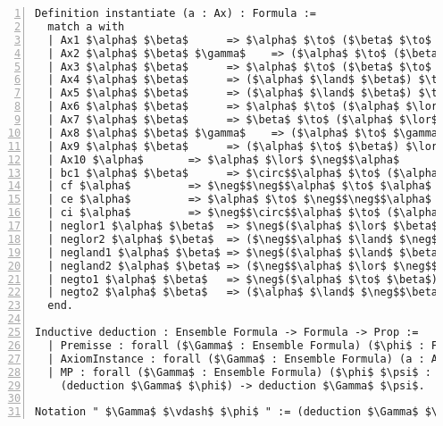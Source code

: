\begin{lstlisting}[name=Syntax, numbers=left, frame=single, language=coq]
Definition instantiate (a : Ax) : Formula :=
  match a with 
  | Ax1 $\alpha$ $\beta$      => $\alpha$ $\to$ ($\beta$ $\to$ $\alpha$)
  | Ax2 $\alpha$ $\beta$ $\gamma$    => ($\alpha$ $\to$ ($\beta$ $\to$ $\gamma$)) $\to$ (($\alpha$ $\to$ $\beta$) $\to$ ($\alpha$ $\to$ $\gamma$))
  | Ax3 $\alpha$ $\beta$      => $\alpha$ $\to$ ($\beta$ $\to$ ($\alpha$ $\land$ $\beta$))
  | Ax4 $\alpha$ $\beta$      => ($\alpha$ $\land$ $\beta$) $\to$ $\alpha$
  | Ax5 $\alpha$ $\beta$      => ($\alpha$ $\land$ $\beta$) $\to$ $\beta$
  | Ax6 $\alpha$ $\beta$      => $\alpha$ $\to$ ($\alpha$ $\lor$ $\beta$)
  | Ax7 $\alpha$ $\beta$      => $\beta$ $\to$ ($\alpha$ $\lor$ $\beta$)
  | Ax8 $\alpha$ $\beta$ $\gamma$    => ($\alpha$ $\to$ $\gamma$) $\to$ (($\beta$ $\to$ $\gamma$) $\to$ (($\alpha$ $\lor$ $\beta$) $\to$ $\gamma$))
  | Ax9 $\alpha$ $\beta$      => ($\alpha$ $\to$ $\beta$) $\lor$ $\alpha$
  | Ax10 $\alpha$       => $\alpha$ $\lor$ $\neg$$\alpha$
  | bc1 $\alpha$ $\beta$      => $\circ$$\alpha$ $\to$ ($\alpha$ $\to$ ($\neg$$\alpha$ $\to$ $\beta$))
  | cf $\alpha$         => $\neg$$\neg$$\alpha$ $\to$ $\alpha$
  | ce $\alpha$         => $\alpha$ $\to$ $\neg$$\neg$$\alpha$
  | ci $\alpha$         => $\neg$$\circ$$\alpha$ $\to$ ($\alpha$ $\land$ $\neg$ $\alpha$)
  | neglor1 $\alpha$ $\beta$  => $\neg$($\alpha$ $\lor$ $\beta$) $\to$ ($\neg$$\alpha$ $\land$ $\neg$$\beta$)
  | neglor2 $\alpha$ $\beta$  => ($\neg$$\alpha$ $\land$ $\neg$$\beta$) $\to$ $\neg$($\alpha$ $\lor$ $\beta$)
  | negland1 $\alpha$ $\beta$ => $\neg$($\alpha$ $\land$ $\beta$) $\to$ ($\neg$$\alpha$ $\lor$ $\neg$$\beta$)
  | negland2 $\alpha$ $\beta$ => ($\neg$$\alpha$ $\lor$ $\neg$$\beta$) $\to$ $\neg$($\alpha$ $\land$ $\beta$)
  | negto1 $\alpha$ $\beta$   => $\neg$($\alpha$ $\to$ $\beta$) $\to$ ($\alpha$ $\land$ $\neg$$\beta$)
  | negto2 $\alpha$ $\beta$   => ($\alpha$ $\land$ $\neg$$\beta$) $\to$ $\neg$($\alpha$ $\to$ $\beta$)
  end.
  
Inductive deduction : Ensemble Formula -> Formula -> Prop :=
  | Premisse : forall ($\Gamma$ : Ensemble Formula) ($\phi$ : Formula), $\phi$ $\in$ $\Gamma$ -> deduction $\Gamma$ $\phi$
  | AxiomInstance : forall ($\Gamma$ : Ensemble Formula) (a : Ax), deduction $\Gamma$ (instantiate a)
  | MP : forall ($\Gamma$ : Ensemble Formula) ($\phi$ $\psi$ : Formula), (deduction $\Gamma$ ($\phi$ $\to$ $\psi$)) -> 
    (deduction $\Gamma$ $\phi$) -> deduction $\Gamma$ $\psi$.

Notation " $\Gamma$ $\vdash$ $\phi$ " := (deduction $\Gamma$ $\phi$) (at level 50, no associativity).
              \end{lstlisting}

